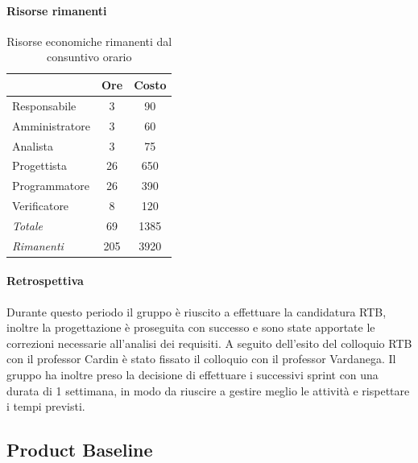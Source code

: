 \documentclass[a4paper,12pt]{article}
\begin{document}
            \paragraph{Risorse rimanenti}
                \begin{table}[H]
                \centering
                \caption{Risorse economiche rimanenti dal consuntivo orario}
                \begin{tabular}{|l|c|c|}
                \hline
                    \rowcolor{lightgray}{\textbf{Ruolo}} & {\textbf{Ore}} & {\textbf{Costo}}\\
                \hline
                    Responsabile & 3 & 90\\
                \hline
                    Amministratore & 3 & 60\\
                \hline
                    Analista & 3 & 75\\
                \hline
                    Progettista & 26 & 650\\
                \hline
                    Programmatore & 26 & 390\\
                \hline
                    Verificatore & 8 & 120\\
                \hline
                    \rowcolor{lightgray}\textit{Totale} & 69 & 1385\\
                \hline
                    \rowcolor{lightgray}\textit{Rimanenti} & 205 & 3920\\
                \hline
                \end{tabular}
                \end{table}
                
            \paragraph{Retrospettiva}
            Durante questo periodo il gruppo è riuscito a effettuare la candidatura RTB, inoltre la progettazione è proseguita con successo e sono state apportate le correzioni necessarie all'analisi dei requisiti. A seguito dell'esito del colloquio RTB con il professor Cardin è stato fissato il colloquio con il professor Vardanega.
            Il gruppo ha inoltre preso la decisione di effettuare i successivi sprint con una durata di 1 settimana, in modo da riuscire a gestire meglio le attività e rispettare i tempi previsti.

    \subsection{Product Baseline}
\end{document}
